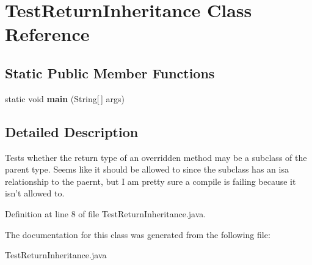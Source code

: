 \section{Test\-Return\-Inheritance Class Reference}
\label{classTestReturnInheritance}
\subsection*{Static Public Member Functions}
\begin{CompactItemize}
\item 
static void {\bf main} (String[$\,$] args)\label{classTestReturnInheritance_2d3efbec24178ba3891df6bdfaaeee41}

\end{CompactItemize}


\subsection{Detailed Description}
Tests whether the return type of an overridden method may be a subclass of the parent type. Seems like it should be allowed to since the subclass has an isa relationship to the paernt, but I am pretty sure a compile is failing because it isn't allowed to. 



Definition at line 8 of file Test\-Return\-Inheritance.java.

The documentation for this class was generated from the following file:\begin{CompactItemize}
\item 
Test\-Return\-Inheritance.java\end{CompactItemize}

